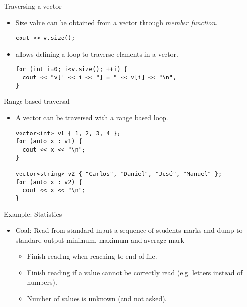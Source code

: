 \begin{frame}[t,fragile]{Traversing a vector}
\begin{itemize}
  \item Size value can be obtained from a vector through  \emph{member function}.
\begin{lstlisting}
cout << v.size();
\end{lstlisting}

  \vfill
  \item {} allows defining a loop to traverse elements in a vector.
\begin{lstlisting}
for (int i=0; i<v.size(); ++i) {
  cout << "v[" << i << "] = " << v[i] << "\n";
}
\end{lstlisting}

\end{itemize}
\end{frame}

\begin{frame}[t,fragile]{Range based traversal}
\begin{itemize}
  \item A vector can be traversed with a range based loop.
\begin{lstlisting}
vector<int> v1 { 1, 2, 3, 4 };
for (auto x : v1) {
  cout << x << "\n";
}

vector<string> v2 { "Carlos", "Daniel", "José", "Manuel" };
for (auto x : v2) {
  cout << x << "\n";
}
\end{lstlisting}
\end{itemize}
\end{frame}

\begin{frame}[t]{Example: Statistics}
\begin{itemize}
  \item \alert{Goal}: Read from standard input a sequence of students marks
        and dump to standard output minimum, maximum and average mark.
    \begin{itemize}
      \item Finish reading when reaching to end-of-file.
      \item Finish reading if a value cannot be correctly read (e.g. letters instead of numbers).
      \item Number of values is unknown (and not asked).
    \end{itemize}
\end{itemize}
\end{frame}

